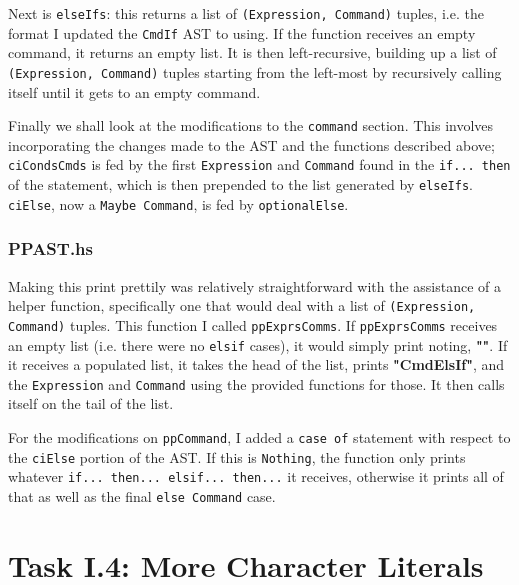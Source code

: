 \documentclass[12pt]{article}
\newcommand{\lstin}[3]{
  
}
\begin{document}
\lstin{133}{135}{Parser.y}

Next is \verb|elseIfs|: this returns a list of \verb|(Expression, Command)| tuples, i.e. the format I updated the \verb|CmdIf| AST to using. 
If the function receives an empty command, it returns an empty list. 
It is then left-recursive, building up a list of \verb|(Expression, Command)| tuples starting from the left-most by recursively calling itself until it gets to an empty command.

\lstin{137}{139}{Parser.y}

Finally we shall look at the modifications to the \verb|command| section. 
This involves incorporating the changes made to the AST and the functions described above; \verb|ciCondsCmds| is fed by the first \verb|Expression| and \verb|Command| found in the \verb|if... then| of the statement, which is then prepended to the list generated by \verb|elseIfs|. 
\verb|ciElse|, now a \verb|Maybe Command|, is fed by \verb|optionalElse|.

\lstin{118}{119}{Parser.y}

\subsubsection{PPAST.hs}
Making this print prettily was relatively straightforward with the assistance of a helper function, specifically one that would deal with a list of \verb|(Expression, Command)| tuples. 
This function I called \verb|ppExprsComms|. 
If \verb|ppExprsComms| receives an empty list (i.e. there were no \verb|elsif| cases), it would simply print noting, \textbf{""}. 
If it receives a populated list, it takes the head of the list, prints \textbf{"CmdElsIf"}, and the \verb|Expression| and \verb|Command| using the provided functions for those. 
It then calls itself on the tail of the list.

\lstin{75}{79}{PPAST.hs}

For the modifications on \verb|ppCommand|, I added a \verb|case of| statement with respect to the \verb|ciElse| portion of the AST. 
If this is \verb|Nothing|, the function only prints whatever \verb|if... then... elsif... then...| it receives, otherwise it prints all of that as well as the final \verb|else Command|  case.

\lstin{54}{61}{PPAST.hs}

\iffalse
\section{Task I.4: More Character Literals}
\end{document}
